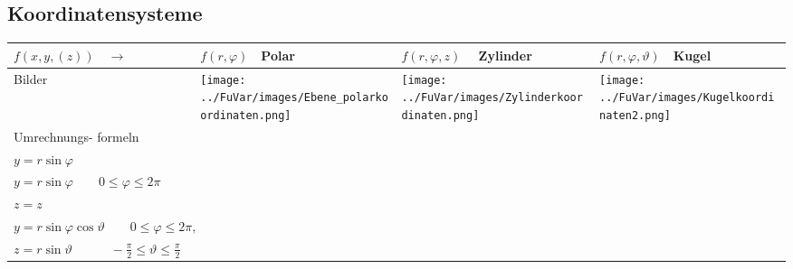 \subsection{Koordinatensysteme}
\begin{tabular}{|p{2.5cm}||p{3cm}|p{4.2cm}|p{7.5cm}|}
	\hline
	$f(x,y,(z))\quad\rightarrow$ &
	\begin{minipage}{2.4cm}
    	\vspace{0.1cm}
		$f(r,\varphi)\quad$\textbf{Polar} 
    	\vspace{0.1cm}    	
    \end{minipage}& 
	$f(r,\varphi,z)\quad$ \textbf{Zylinder} &
	$f(r,\varphi,\vartheta)\quad$\textbf{Kugel}\\
	\hline
	\hline
	Bilder &
	\begin{minipage}{3cm}
    	\texttt{[image: ../FuVar/images/Ebene\_polarkoordinaten.png]}
    \end{minipage}&
	\begin{minipage}{4.2cm}
    	\texttt{[image: ../FuVar/images/Zylinderkoordinaten.png]}
    \end{minipage}&
	\begin{minipage}{4.2cm}
    	\texttt{[image: ../FuVar/images/Kugelkoordinaten2.png]}
    \end{minipage}\\
	\hline
	Umrechnungs- formeln &
	\begin{minipage}{3cm}
    \vspace{0.1cm}
		$x=r\cos\varphi$\\
		$y=r\sin\varphi$    
    \vspace{0.1cm}
    \end{minipage}&	
	\begin{minipage}{4.2cm}
    \vspace{0.1cm}
    	$x=r\cos\varphi \qquad r \geq 0$\\
    	$y=r\sin\varphi \qquad 0 \leq \varphi \leq 2\pi$\\
    	$z=z$
    \vspace{0.1cm}
    \end{minipage}&	
	\begin{minipage}{7.5cm}
    \vspace{0.1cm}
    	$x=r\cos\varphi\cos\vartheta \quad\quad r \geq 0,$\\
    	$y=r\sin\varphi\cos\vartheta \quad\quad  0\leq\varphi\leq 2\pi,$\\
    	$z=r\sin\vartheta \quad\quad\quad
    	-\frac{\pi}{2}\leq\vartheta\leq\frac{\pi}{2}$

\end{minipage}
\end{tabular}

